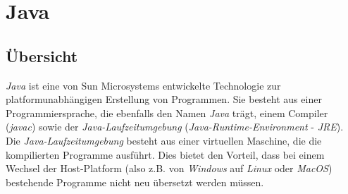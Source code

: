 \section{Java}
    \subsection{Übersicht}

        \emph{Java} ist eine von Sun Microsystems entwickelte Technologie zur platformunabhängigen 
        Erstellung von Programmen. Sie besteht aus einer Programmiersprache, die ebenfalls den Namen
        \emph{Java} trägt, einem Compiler (\emph{javac}) sowie der \emph{Java-Laufzeitumgebung} 
        (\emph{Java-Runtime-Environment} - \emph{JRE}).
        Die \emph{Java-Laufzeitumgebung} besteht aus einer virtuellen Maschine, die die kompilierten Programme ausführt.
        Dies bietet den Vorteil, dass bei einem Wechsel der Host-Platform (also z.B. von \emph{Windows} auf \emph{Linux}
        oder \emph{MacOS}) bestehende Programme nicht neu übersetzt werden müssen.\\

